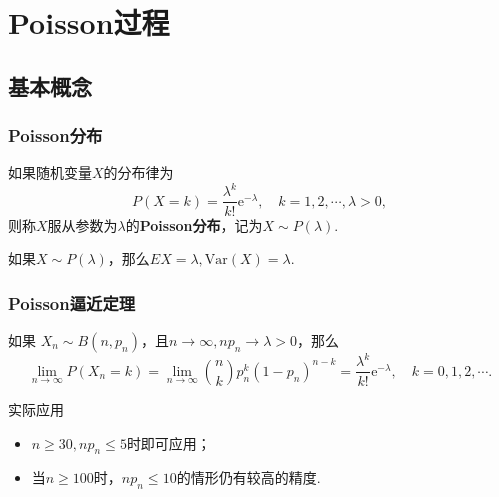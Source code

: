 \section{Poisson过程}

\subsection{基本概念}

\begin{frame}
    \frametitle{Poisson分布}
    \begin{mydefinition}[Poisson分布]
        如果随机变量$X$的分布律为
        \begin{equation}
            P(X=k)=\frac{\lambda^k}{k!}\mathrm e^{-\lambda},\quad k=1,2,\cdots,\lambda>0,
        \end{equation}
        则称$X$服从参数为$\lambda$的\textbf{Poisson分布}，记为$X\sim P(\lambda)$.
    \end{mydefinition}

    \begin{myproposition}[Poisson分布的数字特征]
        如果$X\sim P(\lambda)$，那么$EX=\lambda,\mathrm{Var}(X)=\lambda$. 
    \end{myproposition}
\end{frame}

\begin{frame}
    \frametitle{Poisson逼近定理}
    \begin{mytheorem}[Poisson逼近定理]
        如果 $X_n\sim B(n,p_n)$，且$n\to\infty,np_n\to\lambda>0$，那么
        \begin{equation}
            \lim_{n\to\infty}P(X_n=k)=\lim_{n\to\infty}\binom nk p_n^k(1-p_n)^{n-k}=\frac{\lambda^k}{k!}\mathrm e^{-\lambda},\quad k=0,1,2,\cdots.
        \end{equation}
    \end{mytheorem}
    \begin{exampleblock}{实际应用\footnotemark}
        \begin{itemize}
            \item $n\geqslant 30,np_n\leqslant 5$时即可应用；
            \item 当$n\geqslant100$时，$np_n\leqslant 10$的情形仍有较高的精度. 
        \end{itemize}
    \end{exampleblock}
\end{frame}

